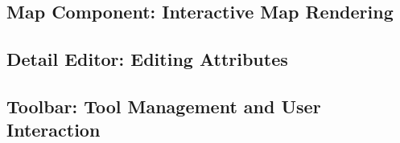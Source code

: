 \subsection{Map Component: Interactive Map Rendering}


\subsection{Detail Editor: Editing Attributes}


\subsection{Toolbar: Tool Management and User Interaction}

